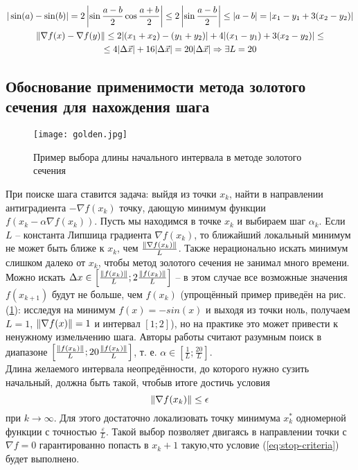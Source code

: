 \documentclass[main.tex]{subfiles}
\begin{document}
\begin{gather*}
|\sin(a) - \sin(b)| = 2 \left|\sin \frac{a-b}{2} \cos \frac{a+b}{2}\right| \le 2 \left|\sin\frac{a-b}{2}\right|\le |a-b|=|x_1-y_1 + 3(x_2-y_2)|\\
\left\lVert\nabla f(x)-\nabla f(y)\right\rVert \le 2 |(x_1+x_2)-(y_1+y_2)|+4|(x_1-y_1)+3(x_2-y_2)|\le \\
\le 4 |\Delta \vec{x}| + 16 |\Delta \vec{x}| = 20 |\Delta \vec{x}|  \Rightarrow \exists L = 20\\
\end{gather*}

\subsection{Обоснование применимости метода золотого сечения для нахождения шага}
\begin{figure}[h]
	\centering \texttt{[image: golden.jpg]}
	\caption{Пример выбора длины начального интервала в методе золотого сечения}
	\label{im:golden}
\end{figure}
При поиске шага ставится задача: выйдя из точки $x_k$, найти в направлении антиградиента $-\nabla f(x_k)$ точку, дающую минимум функции $f(x_k-\alpha \nabla f(x_k))$. 
Пусть мы находимся в точке $x_k$ и выбираем шаг $\alpha_k$. Если $L$ -- константа Липшица градиента $\nabla f(x_k)$, то ближайший локальный минимум не может быть ближе к $x_k$, чем $\frac{\left\lVert\nabla f(x_k)\right\rVert}{L}$. Также нерационально искать минимум слишком далеко от $x_k$, чтобы метод золотого сечения не занимал много времени. Можно искать $\Delta x \in \left[ \frac{\left\lVert f(x_k)\right\rVert}{L}; 2\frac{\left\lVert f(x_k)\right\rVert}{L}\right]$ -- в этом случае все возможные значения $f(x_{k+1})$ будут не больше, чем $f(x_k)$ (упрощённый пример приведён на рис. (\ref{im:golden}): исследуя на минимум $f(x)=-sin(x)$ и выходя из точки ноль, получаем $L=1$, $\left\lVert\nabla f(x)\right\rVert = 1$ и интервал $[1;2]$), но на практике это может привести к ненужному измельчению шага. Авторы работы считают разумным поиск в диапазоне $\left[ \frac{\left\lVert f(x_k)\right\rVert}{L}; 20\frac{\left\lVert f(x_k)\right\rVert}{L}\right]$, т. е. $\alpha \in \left[\frac{1}{L}; \frac{20}{L}\right]$. \\

Длина желаемого интервала неопредённости, до которого нужно сузить начальный, должна быть такой, чтобыв итоге достичь условия \\

\begin{equation}\label{eq:stop-criteria}
\left\lVert\nabla f(x_k)\right\rVert \le \epsilon
\end{equation}
 при $k \rightarrow \infty$. Для этого достаточно локализовать точку минимума $x_k^*$ одномерной функции с точностью $\frac{\varepsilon}{L}$. Такой выбор позволяет двигаясь в направлении точки с $\nabla f = 0$ гарантированно попасть в $x_k+1$ такую,что условие (\ref{eq:stop-criteria}) будет выполнено.
\end{document}
